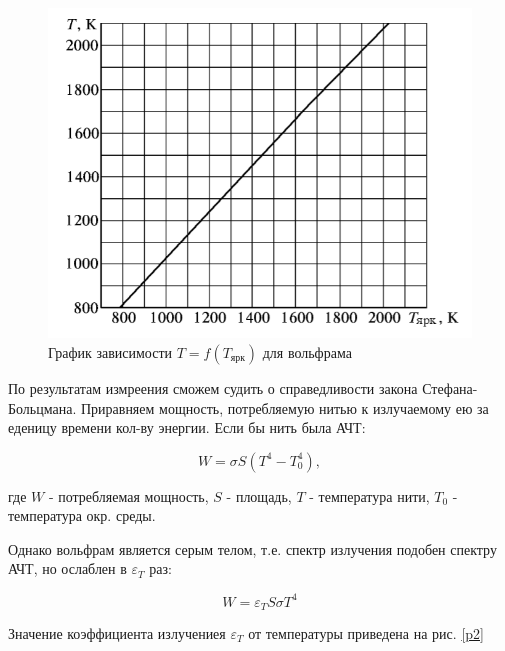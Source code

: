 \documentclass[a4paper]{article}
\begin{document}
\begin{figure}[H]
    \begin{center}
    \includegraphics[scale = 0.6]{p1.png}
    \caption{График зависимости $T = f(T_{\text{ярк}})$ для вольфрама}
    \label{p1}
    \end{center}
\end{figure}

По результатам измреения сможем судить о справедливости закона Стефана-Больцмана. Приравняем мощность, 
потребляемую нитью к излучаемому ею за еденицу времени кол-ву энергии. Если бы нить была АЧТ:

\begin{equation}
    W = \sigma S (T^4 - T_0^4),
\end{equation}

где $W$ - потребляемая мощность, $S$ - площадь, $T$ - температура нити,  $T_0$ - температура окр. среды.\par

Однако вольфрам является серым телом, т.е. спектр излучения подобен спектру АЧТ, но ослаблен в $\varepsilon_T$ раз:

\begin{equation}
    W = \varepsilon_T S \sigma T^4
\end{equation}

Значение коэффициента излучениея $\varepsilon_T$ от температуры приведена на рис. \ref{p2}
\end{document}
